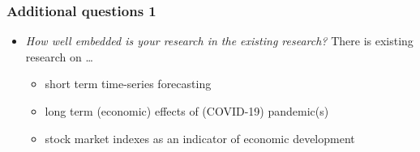 \documentclass[aspectratio=169,classic]{uva-inf-presentation}
\begin{document}






\begin{frame}
\frametitle{Additional questions 1}
\begin{itemize}
    \item \textit{How well embedded is your research in the existing research?} \newline
    There is existing research on \ldots
    \begin{itemize}
        \item short term time-series forecasting
        \item long term (economic) effects of (COVID-19) pandemic(s)
        \item stock market indexes as an indicator of economic development
    \end{itemize}
\end{itemize}
\end{frame}
\end{document}
